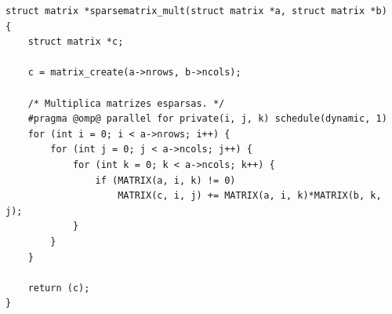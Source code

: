 \documentclass{SBCbookchapter}
\begin{document}
\begin{lstlisting}[float,floatplacement=b,frame=single, caption=Exemplo de multiplicação de matrizes esparsas.,
label=listing:sparsematrixmult]
struct matrix *sparsematrix_mult(struct matrix *a, struct matrix *b)
{
	struct matrix *c;

	c = matrix_create(a->nrows, b->ncols);

	/* Multiplica matrizes esparsas. */
	#pragma @omp@ parallel for private(i, j, k) schedule(dynamic, 1)
	for (int i = 0; i < a->nrows; i++) {
		for (int j = 0; j < a->ncols; j++) {
			for (int k = 0; k < a->ncols; k++) {
				if (MATRIX(a, i, k) != 0)
					MATRIX(c, i, j) += MATRIX(a, i, k)*MATRIX(b, k, j);
			}
		}
	}

	return (c);
}
\end{lstlisting}
		
\end{document}
